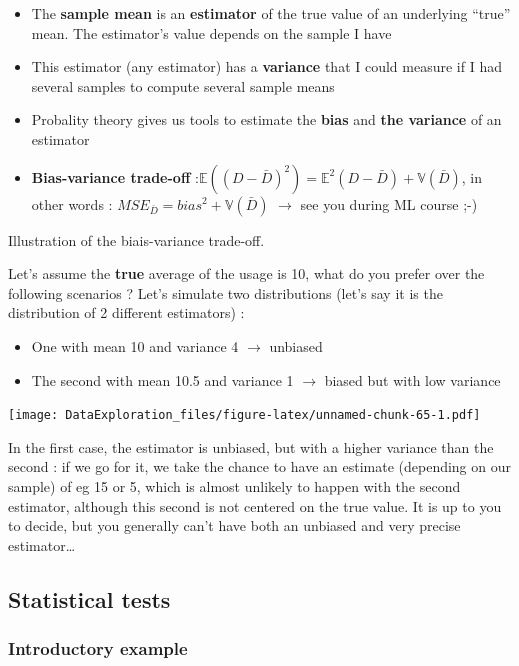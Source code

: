 \documentclass[
]{book}
\providecommand{\tightlist}{%
  \setlength{\itemsep}{0pt}\setlength{\parskip}{0pt}}
\begin{document}
\begin{itemize}
\tightlist
\item
  The \textbf{sample mean} is an \textbf{estimator} of the true value of an underlying ``true'' mean. The estimator's value depends on the sample I have
\item
  This estimator (any estimator) has a \textbf{variance} that I could measure if I had several samples to compute several sample means
\item
  Probality theory gives us tools to estimate the \textbf{bias} and \textbf{the variance} of an estimator
\item
  \textbf{Bias-variance trade-off} :\(\mathbb{E}((D-\bar{D})^2)=\mathbb{E}^2(D-\bar{D}) + \mathbb{V}(\bar{D})\), in other words : \(MSE_{\bar{D}} = bias^2 + \mathbb{V}(\bar{D})\) \(\rightarrow\) see you during ML course ;-)
\end{itemize}

Illustration of the biais-variance trade-off.

Let's assume the \textbf{true} average of the usage is 10, what do you prefer over the following scenarios ? Let's simulate two distributions (let's say it is the distribution of 2 different estimators) :

\begin{itemize}
\tightlist
\item
  One with mean 10 and variance 4 \(\rightarrow\) unbiased
\item
  The second with mean 10.5 and variance 1 \(\rightarrow\) biased but with low variance
\end{itemize}

\texttt{[image: DataExploration\_files/figure-latex/unnamed-chunk-65-1.pdf]}

In the first case, the estimator is unbiased, but with a higher variance than the second : if we go for it, we take the chance to have an estimate (depending on our sample) of eg 15 or 5, which is almost unlikely to happen with the second estimator, although this second is not centered on the true value.
It is up to you to decide, but you generally can't have both an unbiased and very precise estimator\ldots{}

\hypertarget{statistical-tests}{%
\subsection{Statistical tests}\label{statistical-tests}}

\hypertarget{introductory-example}{%
\subsubsection{Introductory example}\label{introductory-example}}
\end{document}
